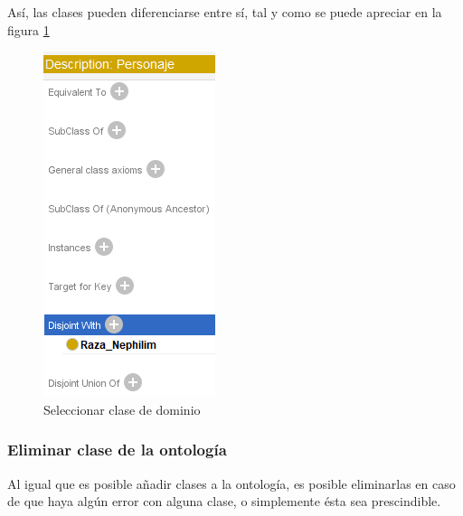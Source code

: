 \begin{enumerate}
    Así, las clases pueden diferenciarse entre sí, tal y como se puede apreciar en la figura \ref*{CreateClass_11}
    \begin{figure}[ht]
        \centering
        \includegraphics[scale=0.6]{Figures/Protege/CreateClass_11.png}
        \caption{Seleccionar clase de dominio}
        \label{CreateClass_11}
    \end{figure}
\end{enumerate}

\subsubsection{Eliminar clase de la ontología}
Al igual que es posible añadir clases a la ontología, es posible eliminarlas en caso de que haya algún error con alguna clase, o 
simplemente ésta sea prescindible.

